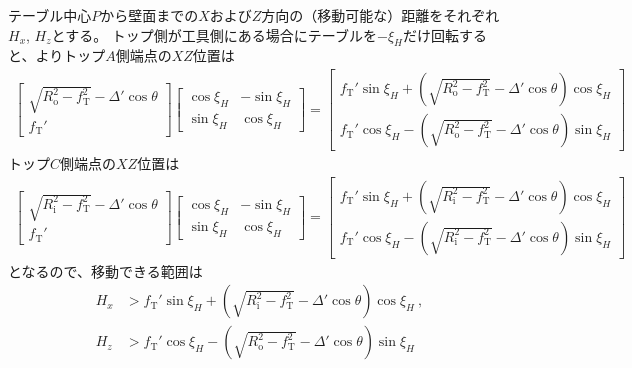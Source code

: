 テーブル中心$P$から壁面までの$X$および$Z$方向の（移動可能な）距離をそれぞれ$H_x$, $H_z$とする。
トップ側が工具側にある場合にテーブルを$-\xi_H$だけ回転すると、よりトップ$A$側端点の$XZ$位置は
\begin{align*}
  \left[
  \begin{array}{c}
    \sqrt{R_\mathrm o^2-f_\mathrm T^2}-\varDelta'\cos\theta\\[3pt]
    f_\mathrm T'
  \end{array}
  \right]\!\!\!
  \left[
  \begin{array}{cc}
    \cos\xi_H & -\sin\xi_H\\[3pt]
    \sin\xi_H & \cos\xi_H
  \end{array}
  \right]
  = \left[
    \begin{array}{c}
      f_\mathrm T'\sin\xi_H+\left(\sqrt{R_\mathrm o^2-f_\mathrm T^2}-\varDelta'\cos\theta\right)\!\cos\xi_H\\[5pt]
      f_\mathrm T'\cos\xi_H-\left(\sqrt{R_\mathrm o^2-f_\mathrm T^2}-\varDelta'\cos\theta\right)\!\sin\xi_H
    \end{array}
    \right]
\end{align*}
トップ$C$側端点の$XZ$位置は
\begin{align*}
  \left[
  \begin{array}{c}
    \sqrt{R_\mathrm i^2-f_\mathrm T^2}-\varDelta'\cos\theta\\[3pt]
    f_\mathrm T'
  \end{array}
  \right]\!\!\!
  \left[
  \begin{array}{cc}
    \cos\xi_H & -\sin\xi_H\\[3pt]
    \sin\xi_H & \cos\xi_H
  \end{array}
  \right]
  = \left[
    \begin{array}{c}
      f_\mathrm T'\sin\xi_H+\left(\sqrt{R_\mathrm i^2-f_\mathrm T^2}-\varDelta'\cos\theta\right)\!\cos\xi_H\\[5pt]
      f_\mathrm T'\cos\xi_H-\left(\sqrt{R_\mathrm i^2-f_\mathrm T^2}-\varDelta'\cos\theta\right)\!\sin\xi_H
    \end{array}
    \right]
\end{align*}
となるので、移動できる範囲は
\begin{align*}
  H_x &> f_\mathrm T'\sin\xi_H+\left(\sqrt{R_\mathrm i^2-f_\mathrm T^2}-\varDelta'\cos\theta\right)\!\cos\xi_H\ ,\\
  H_z &> f_\mathrm T'\cos\xi_H-\left(\sqrt{R_\mathrm o^2-f_\mathrm T^2}-\varDelta'\cos\theta\right)\!\sin\xi_H
\end{align*}
